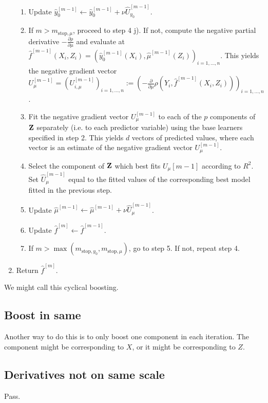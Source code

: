 \begin{algorithm}
\begin{enumerate}
\begin{enumerate}
        \item Update $\hat{y}_0^{[m-1]}\gets\hat{y}_0^{[m-1]}+\nu\hat{U}_{y_0}^{[m-1]}$.
        \item If $m>m_{\text{stop},\mu}$, proceed to step 4 j). If not, compute the negative partial derivative $-\frac{\partial\rho}{\partial \mu}$ and evaluate at $\hat{f}^{[m-1]}(X_i,Z_i)=\left(\hat{y}_0^{[m-1]}(X_i),\hat{\mu}^{[m-1]}(Z_i)\right)_{i=1,\ldots,n}$. This yields the negative gradient vector $U_{\mu}^{[m-1]}=\left(U_{i,\mu}^{[m-1]}\right)_{i=1,\ldots,n}:=\left(-\frac{\partial}{\partial \mu}\rho\left(Y_i,\hat{f}^{[m-1]}(X_i,Z_i)\right)\right)_{i=1,\ldots,n}$.
        \item Fit the negative gradient vector $U_{\mu}^{[m-1]}$ to each of the $p$ components of $\mathbf{Z}$ separately (i.e. to each predictor variable) using the base learners specified in step 2. This yields $d$ vectors of predicted values, where each vector is an estimate of the negative gradient vector $U_{\mu}^{[m-1]}$.
        \item Select the component of $\mathbf{Z}$ which best fits $U_{\mu}{[m-1]}$ according to $R^2$. Set $\hat{U}_{\mu}^{[m-1]}$ equal to the fitted values of the corresponding best model fitted in the previous step.
        \item Update $\hat{\mu}^{[m-1]}\gets\hat{\mu}^{[m-1]}+\nu\hat{U}_{\mu}^{[m-1]}$.
        \item Update $\hat{f}^{[m]}\gets\hat{f}^{[m-1]}$.
        \item If $m>\max(m_{\text{stop},y_0},m_{\text{stop},\mu})$, go to step 5. If not, repeat step 4.
    \end{enumerate}
    \item Return $\hat{f}^{[m]}$.
\end{enumerate}
\end{algorithm}
We might call this cyclical boosting.

\subsection{Boost in same}
Another way to do this is to only boost one component in each iteration. The component might be corresponding to $X$, or it might be corresponding to $Z$.



\subsection{Derivatives not on same scale}
Pass.

